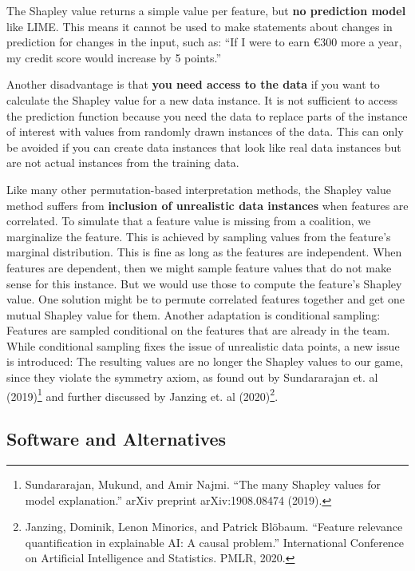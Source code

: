 \documentclass[12pt,]{krantz}
\newcommand{\euro}{€}
\begin{document}
The Shapley value returns a simple value per feature, but \textbf{no
prediction model} like LIME. This means it cannot be used to make
statements about changes in prediction for changes in the input, such
as: ``If I were to earn \euro{}300 more a year, my credit score would
increase by 5 points.''

Another disadvantage is that \textbf{you need access to the data} if you
want to calculate the Shapley value for a new data instance. It is not
sufficient to access the prediction function because you need the data
to replace parts of the instance of interest with values from randomly
drawn instances of the data. This can only be avoided if you can create
data instances that look like real data instances but are not actual
instances from the training data.

Like many other permutation-based interpretation methods, the Shapley
value method suffers from \textbf{inclusion of unrealistic data
instances} when features are correlated. To simulate that a feature
value is missing from a coalition, we marginalize the feature. This is
achieved by sampling values from the feature's marginal distribution.
This is fine as long as the features are independent. When features are
dependent, then we might sample feature values that do not make sense
for this instance. But we would use those to compute the feature's
Shapley value. One solution might be to permute correlated features
together and get one mutual Shapley value for them. Another adaptation
is conditional sampling: Features are sampled conditional on the
features that are already in the team. While conditional sampling fixes
the issue of unrealistic data points, a new issue is introduced: The
resulting values are no longer the Shapley values to our game, since
they violate the symmetry axiom, as found out by Sundararajan et. al
(2019)\footnote{Sundararajan, Mukund, and Amir Najmi. ``The many Shapley
  values for model explanation.'' arXiv preprint arXiv:1908.08474
  (2019).} and further discussed by Janzing et. al (2020)\footnote{Janzing,
  Dominik, Lenon Minorics, and Patrick Blöbaum. ``Feature relevance
  quantification in explainable AI: A causal problem.'' International
  Conference on Artificial Intelligence and Statistics. PMLR, 2020.}.

\subsection{Software and
Alternatives}\label{software-and-alternatives-5}
\end{document}
